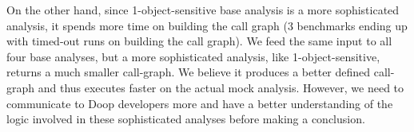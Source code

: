 On the other hand, since 1-object-sensitive base analysis is a more sophisticated analysis, it spends more time on building the call graph (3 benchmarks ending up with timed-out runs on building the call graph). We feed the same input to all four base analyses, but a more sophisticated analysis, like 1-object-sensitive, returns a much smaller call-graph. We believe it produces a better defined call-graph and thus executes faster on the actual mock analysis. However, we need to communicate to Doop developers more and have a better understanding of the logic involved in these sophisticated analyses before making a conclusion.





